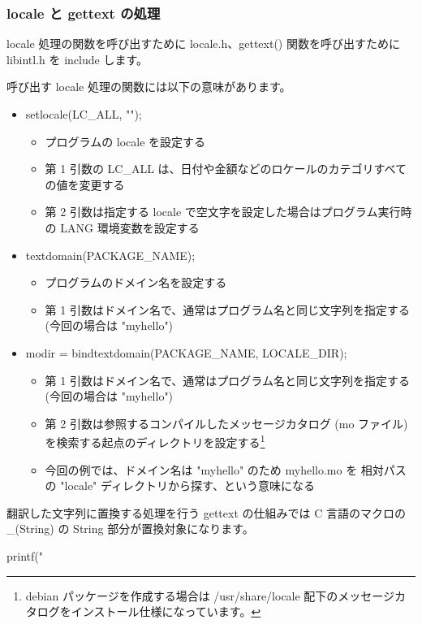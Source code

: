 \documentclass[mingoth,a4paper]{jsarticle}
\begin{document}
\subsubsection{locale と gettext の処理}

locale 処理の関数を呼び出すために locale.h、gettext() 関数を呼び出すために libintl.h を include します。

呼び出す locale 処理の関数には以下の意味があります。

\begin{itemize}
\item setlocale(LC\_ALL, "");
  \begin{itemize}
  \item プログラムの locale を設定する
  \item 第 1 引数の LC\_ALL は、日付や金額などのロケールのカテゴリすべての値を変更する
  \item 第 2 引数は指定する locale で空文字を設定した場合はプログラム実行時の LANG 環境変数を設定する
  \end{itemize}
\item textdomain(PACKAGE\_NAME);
  \begin{itemize}
  \item プログラムのドメイン名を設定する
  \item 第 1 引数はドメイン名で、通常はプログラム名と同じ文字列を指定する (今回の場合は "myhello")
  \end{itemize}
\item modir = bindtextdomain(PACKAGE\_NAME, LOCALE\_DIR);
  \begin{itemize}
  \item 第 1 引数はドメイン名で、通常はプログラム名と同じ文字列を指定する (今回の場合は "myhello")
  \item 第 2 引数は参照するコンパイルしたメッセージカタログ (mo ファイル) を検索する起点のディレクトリを設定する\footnote{debian パッケージを作成する場合は /usr/share/locale 配下のメッセージカタログをインストール仕様になっています。}
  \item 今回の例では、ドメイン名は "myhello" のため myhello.mo を 相対パスの "locale" ディレクトリから探す、という意味になる
  \end{itemize}
\end{itemize}

翻訳した文字列に置換する処理を行う gettext の仕組みでは C 言語のマクロの \_(String) の String 部分が置換対象になります。

\begin{commandline}
    printf("%
\end{commandline}
\end{document}
